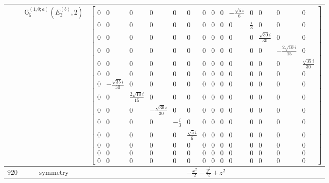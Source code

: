\documentclass[fleqn,8pt,landscape]{jsarticle}
\begin{document}
\begin{longtable}{ccc}
$  $ & $ \mathbb{G}_{5}^{(1,0;a)}(E_{2}^{(b)},2) $ & $ \begin{bmatrix} 0 & 0 & 0 & 0 & 0 & 0 & 0 & 0 & 0 & - \frac{\sqrt{5} i}{6} & 0 & 0 & 0 & 0 \\ 0 & 0 & 0 & 0 & 0 & 0 & 0 & 0 & 0 & 0 & \frac{i}{3} & 0 & 0 & 0 \\ 0 & 0 & 0 & 0 & 0 & 0 & 0 & 0 & 0 & 0 & 0 & \frac{\sqrt{30} i}{30} & 0 & 0 \\ 0 & 0 & 0 & 0 & 0 & 0 & 0 & 0 & 0 & 0 & 0 & 0 & - \frac{2 \sqrt{10} i}{15} & 0 \\ 0 & 0 & 0 & 0 & 0 & 0 & 0 & 0 & 0 & 0 & 0 & 0 & 0 & \frac{\sqrt{35} i}{30} \\ 0 & 0 & 0 & 0 & 0 & 0 & 0 & 0 & 0 & 0 & 0 & 0 & 0 & 0 \\ 0 & - \frac{\sqrt{35} i}{30} & 0 & 0 & 0 & 0 & 0 & 0 & 0 & 0 & 0 & 0 & 0 & 0 \\ 0 & 0 & \frac{2 \sqrt{10} i}{15} & 0 & 0 & 0 & 0 & 0 & 0 & 0 & 0 & 0 & 0 & 0 \\ 0 & 0 & 0 & - \frac{\sqrt{30} i}{30} & 0 & 0 & 0 & 0 & 0 & 0 & 0 & 0 & 0 & 0 \\ 0 & 0 & 0 & 0 & - \frac{i}{3} & 0 & 0 & 0 & 0 & 0 & 0 & 0 & 0 & 0 \\ 0 & 0 & 0 & 0 & 0 & \frac{\sqrt{5} i}{6} & 0 & 0 & 0 & 0 & 0 & 0 & 0 & 0 \\ 0 & 0 & 0 & 0 & 0 & 0 & 0 & 0 & 0 & 0 & 0 & 0 & 0 & 0 \\ 0 & 0 & 0 & 0 & 0 & 0 & 0 & 0 & 0 & 0 & 0 & 0 & 0 & 0 \\ 0 & 0 & 0 & 0 & 0 & 0 & 0 & 0 & 0 & 0 & 0 & 0 & 0 & 0 \end{bmatrix} $ \\ \hline
$ 920 $ & $ \text{symmetry} $ & $ - \frac{x^{2}}{2} - \frac{y^{2}}{2} + z^{2} $ \\

\end{longtable}
\end{document}
